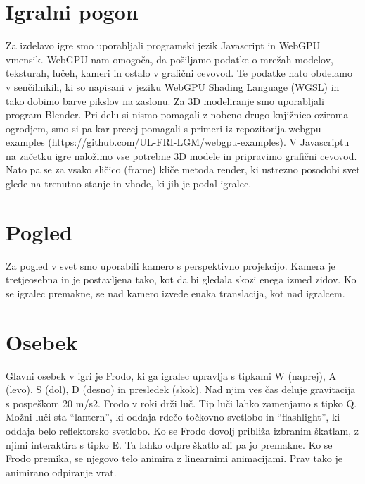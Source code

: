 \documentclass[a4paper,12pt]{article}
\begin{document}
\newpage

\section{Igralni pogon}
\noindent Za izdelavo igre smo uporabljali programski jezik Javascript in WebGPU vmensik. WebGPU nam omogoča, da pošiljamo podatke o mrežah modelov, teksturah, lučeh, kameri in ostalo v grafični cevovod. Te podatke nato obdelamo v senčilnikih, ki so napisani v jeziku WebGPU Shading Language (WGSL) in tako dobimo barve pikslov na zaslonu. Za 3D modeliranje smo uporabljali program Blender. Pri delu si nismo pomagali z nobeno drugo knjižnico oziroma ogrodjem, smo si pa kar precej pomagali s primeri iz repozitorija webgpu-examples (https://github.com/UL-FRI-LGM/webgpu-examples).
V Javascriptu na začetku igre naložimo vse potrebne 3D modele in pripravimo grafični cevovod. Nato pa se za vsako sličico (frame) kliče metoda render, ki ustrezno posodobi svet glede na trenutno stanje in vhode, ki jih je podal igralec.


\newpage

\section{Pogled}
\noindent Za pogled v svet smo uporabili kamero s perspektivno projekcijo. Kamera je tretjeosebna in je postavljena tako, kot da bi gledala skozi enega izmed zidov. Ko se igralec premakne, se nad kamero izvede enaka translacija, kot nad igralcem.

\newpage

\section{Osebek}
\noindent Glavni osebek v igri je Frodo, ki ga igralec upravlja s tipkami W (naprej), A (levo), S (dol), D (desno) in presledek (skok). Nad njim ves čas deluje gravitacija s pospeškom 20 m/s2. Frodo v roki drži luč. Tip luči lahko zamenjamo s tipko Q. Možni luči sta “lantern”, ki oddaja rdečo točkovno svetlobo in “flashlight”, ki oddaja belo reflektorsko svetlobo. Ko se Frodo dovolj približa izbranim škatlam, z njimi interaktira s tipko E. Ta lahko odpre škatlo ali pa jo premakne. Ko se Frodo premika, se njegovo telo animira z linearnimi animacijami. Prav tako je animirano odpiranje vrat.

\newpage

\end{document}
